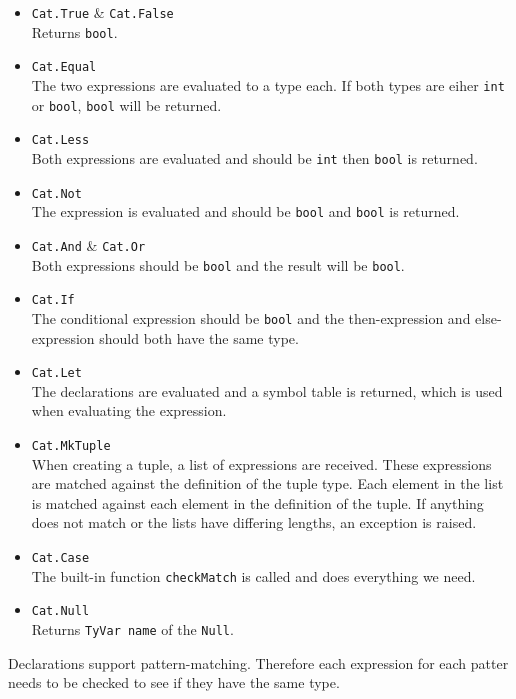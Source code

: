 \documentclass{article}
\begin{document}
\begin{itemize}
	\item {\tt Cat.True} \& {\tt Cat.False} \\
	Returns {\tt bool}.
	\item {\tt Cat.Equal} \\
	The two expressions are evaluated to a type each. If both types are eiher {\tt int} or {\tt bool}, {\tt bool} will be returned.
	\item {\tt Cat.Less} \\
	Both expressions are evaluated and should be {\tt int} then {\tt bool} is returned.
	\item {\tt Cat.Not} \\
	The expression is evaluated and should be {\tt bool} and {\tt bool} is returned.
	\item {\tt Cat.And} \& {\tt Cat.Or} \\
	Both expressions should be {\tt bool} and the result will be {\tt bool}.
	\item {\tt Cat.If} \\
	The conditional expression should be {\tt bool} and the then-expression and else-expression should both have the same type.
	\item {\tt Cat.Let} \\
	The declarations are evaluated and a symbol table is returned, which is used when evaluating the expression.
	\item {\tt Cat.MkTuple} \\
	When creating a tuple, a list of expressions are received. These expressions are matched against the definition of the tuple type. Each element in the list is matched against each element in the definition of the tuple. If anything does not match or the lists have differing lengths, an exception is raised.
	\item {\tt Cat.Case} \\
	The built-in function {\tt checkMatch} is called and does everything we need.
	\item {\tt Cat.Null} \\
	Returns {\tt TyVar name} of the {\tt Null}.
\end{itemize}
Declarations support pattern-matching. Therefore each expression for each patter needs to be checked to see if they have the same type.
\end{document}
